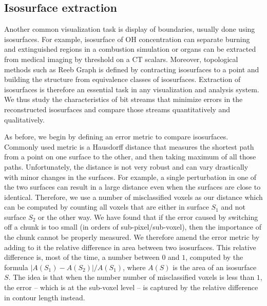 \subsection{Isosurface extraction}
\label{sec:isocontour}
Another common visualization task is display of boundaries, usually done using isosurfaces. For example,
isosurface of OH concentration can separate burning and extinguished regions in a combustion simulation or
organs can be extracted from medical imaging by threshold on a CT scalars. Moreover, topological methods such as Reeb Graph is
defined by contracting isosurfaces to a point and building the structure from equivalence classes of isosurfaces.
Extraction of isosurfaces is therefore an essential task in any
visualization and analysis system. We thus study the characteristics of bit streams that
minimize errors in the reconstructed isosurfaces and compare those streams quantitatively and qualitatively.

As before, we begin by defining an error metric to compare isosurfaces. Commonly used metric is a Hausdorff
distance that measures the shortest path from a point on one surface to the other, and then taking maximum
of all those paths. Unfortunately, the distance is not very robust and can vary drastically with minor changes
in the surfaces. For example, a single perturbation in one of the two surfaces
can result in a large distance even when the surfaces are close to identical. Therefore, we use a number of
misclassified voxels as our distance which can be computed by counting all voxels that are either in surface $S_1$
and not surface $S_2$ or the other way. We have found that if the error caused by
switching off a chunk is too small (in orders of sub-pixel/sub-voxel), then the importance of the
chunk cannot be properly measured. We therefore amend the error metric by adding to it the relative
difference in area between two isosurfaces. This relative difference is, most of the time, a number
between $0$ and $1$, computed by the formula $|A(S_1)-A(S_2)|/A(S_1)$, where $A(S)$ is the area of
an isosurface $S$. The idea is that when the number number of misclassified voxels is less than $1$, the
error -- which is at the sub-voxel level -- is captured by the relative difference in contour length
instead.

